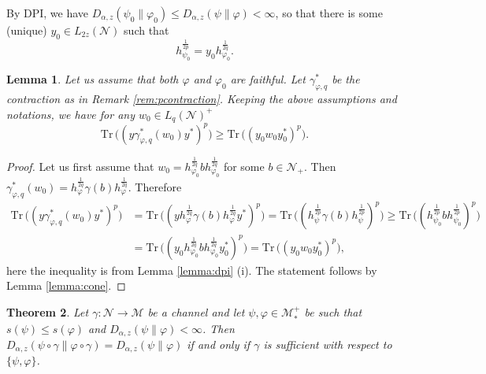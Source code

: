 \documentclass[12pt]{article}
\newtheorem{theorem}{Theorem}[section]
\newtheorem{lemma}[theorem]{Lemma}
\theoremstyle{definition}
\theoremstyle{remark}
\numberwithin{equation}{section}
\def\Me{\mathcal M}
\def\Ne{\mathcal N}
\def \Tr{\mathrm{Tr}\,}
\def\ffi{\varphi}
\begin{document}
By DPI, we have $D_{\alpha,z}(\psi_0\|\varphi_0)\le D_{\alpha,z}(\psi\|\varphi)<\infty$,
so that there is some (unique) $y_0\in L_{2z}(\Ne)$ such that 
\[
h_{\psi_0}^{\frac1{2p}}=y_0h_{\varphi_0}^{\frac1{2q}}.
\]



\begin{lemma}\label{lemma:le} Let us assume that both $\ffi$ and $\ffi_0$ are faithful.
Let $\gamma^*_{\ffi,q}$ be the contraction as in Remark \ref{rem:pcontraction}. Keeping
the above assumptions and notations,   we  have for any $w_0\in
L_q(\Ne)^+$
\[
\Tr\bigl((y\gamma^*_{\ffi,q}(w_0)y^*)^p\bigr)\ge
\Tr \bigl((y_0w_0y_0^*)^p\bigr).
\]

\end{lemma}

\begin{proof} Let us first assume that
$w_0=h_{\varphi_0}^{\frac1{2q}}bh_{\varphi_0}^{\frac1{2q}}$ for some $b\in \Ne_+$. Then 
$\gamma^*_{\varphi,q}(w_0)=h_{\varphi}^{\frac1{2q}}\gamma(b)h_{\varphi}^{\frac1{2q}}$.
Therefore
\begin{align*}
\Tr\bigl((y\gamma^*_{\varphi,q}(w_0)y^*)^p\bigr)&=\Tr\bigl((yh_{\varphi}^{\frac1{2q}}\gamma(b)h_{\varphi}^{\frac1{2q}}y^*)^p\bigr)=
\Tr\bigl((h_\psi^{\frac1{2p}}\gamma(b)h_\psi^{\frac1{2p}})^p\bigr)\ge
\Tr\bigl((h_{\psi_0}^{\frac1{2p}}bh_{\psi_0}^{\frac1{2p}})^p\bigr)\\
&=
\Tr\bigl((y_0h_{\varphi_0}^{\frac1{2q}}bh_{\varphi_0}^{\frac1{2q}}y_0^*)^p\bigr)=\Tr\bigl((y_0w_0y_0^*)^p\bigr),
\end{align*}
here the inequality is from Lemma \ref{lemma:dpi} (i). The statement follows by Lemma
\ref{lemma:cone}.

\end{proof}

\begin{theorem}\label{thm:suffge1} Let $\gamma:\Ne\to \Me$ be a channel and let $\psi,\varphi\in \Me_*^+$ be
such that 
$s(\psi)\le s(\ffi)$ and 
$D_{\alpha,z}(\psi\|\varphi)<\infty$. Then
$D_{\alpha,z}(\psi\circ\gamma\|\ffi\circ\gamma)=D_{\alpha,z}(\psi\|\varphi)$ if and only if
$\gamma$ is sufficient with respect to $\{\psi,\ffi\}$.

\end{theorem}
\end{document}
